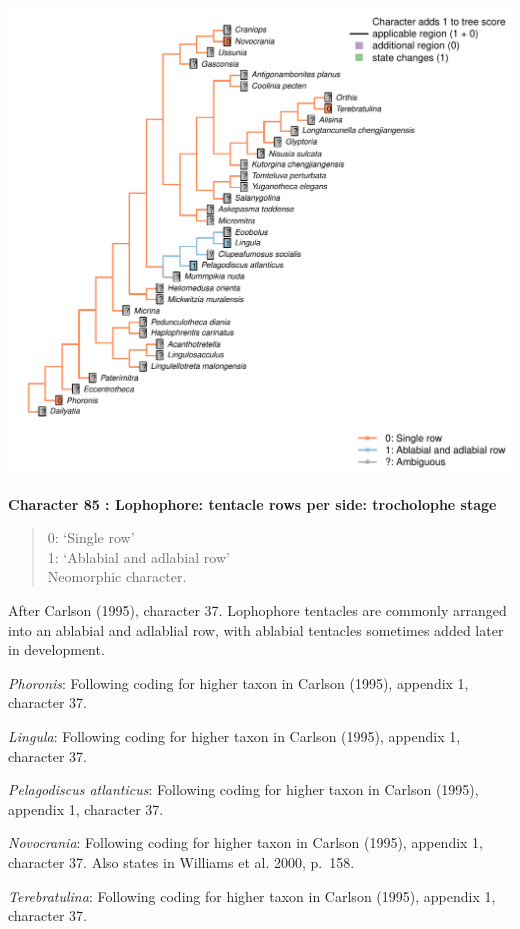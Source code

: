 \documentclass[]{book}
\theoremstyle{definition}
\theoremstyle{definition}
\theoremstyle{definition}
\theoremstyle{remark}
\begin{document}
\includegraphics{Brachiopod_phylogeny_files/figure-latex/unnamed-chunk-5-85.pdf}

\textbf{Character 85 : Lophophore: tentacle rows per side: trocholophe
stage }

\begin{quote}
0: `Single row'\\
1: `Ablabial and adlabial row'\\
Neomorphic character.
\end{quote}

After Carlson (1995), character 37. Lophophore tentacles are commonly
arranged into an ablabial and adlablial row, with ablabial tentacles
sometimes added later in development.

\emph{Phoronis}: Following coding for higher taxon in Carlson (1995),
appendix 1, character 37.

\emph{Lingula}: Following coding for higher taxon in Carlson (1995),
appendix 1, character 37.

\emph{Pelagodiscus atlanticus}: Following coding for higher taxon in
Carlson (1995), appendix 1, character 37.

\emph{Novocrania}: Following coding for higher taxon in Carlson (1995),
appendix 1, character 37. Also states in Williams et al. 2000, p.~158.

\emph{Terebratulina}: Following coding for higher taxon in Carlson
(1995), appendix 1, character 37.
\end{document}
